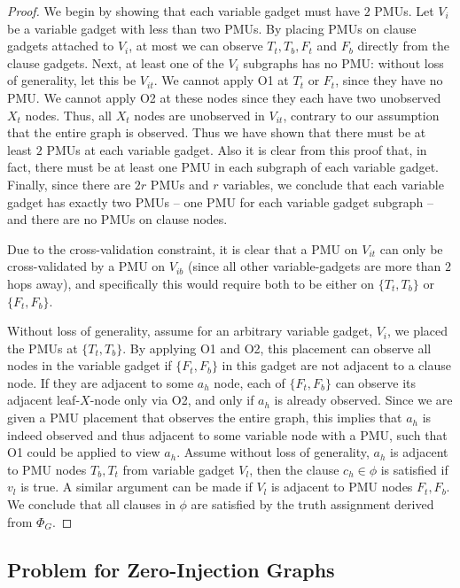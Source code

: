 \begin{proof}
We begin by showing that each variable gadget must have $2$ PMUs. Let
$V_i$ be a variable gadget with less than two PMUs. By placing PMUs on
clause gadgets attached to $V_i$, at most we can observe $T_t, T_b, F_t$ and
$F_b$ directly from the clause gadgets. Next, at least one of the $V_i$
subgraphs has no PMU: without loss of generality, let this be $V_{it}$. 
We cannot apply O1 at $T_t$ or $F_t$,
since they have no PMU. We cannot apply O2 at these nodes since they each have
two unobserved $X_t$ nodes. Thus, all $X_t$ nodes are unobserved in $V_{it}$,
contrary to our assumption that the entire graph is observed. Thus we have
shown that there must be at least $2$ PMUs at each variable gadget. Also 
it is clear from this proof that, in fact, there must be at least one PMU in each subgraph of each
variable gadget. Finally, since there are $2r$ PMUs and $r$ variables, we conclude that 
each variable gadget has exactly two PMUs -- one PMU for each variable gadget subgraph --
and there are no PMUs on clause nodes.

Due to the cross-validation constraint, it is clear that a PMU on $V_{it}$ can only
be cross-validated by a PMU on $V_{ib}$ (since all other variable-gadgets are
more than $2$ hops away), and specifically this would require both to be either
on $\{T_t, T_b\}$ or $\{F_t, F_b\}$. 

Without loss of generality, assume for an arbitrary variable gadget, $V_i$, 
we placed the PMUs at $\{T_t, T_b\}$. By applying O1 and O2, this
placement can observe all nodes in the variable gadget if $\{F_t, F_b\}$ in this gadget
are not adjacent to a clause node. If they are adjacent to some $a_h$ node, each of $\{F_t, F_b\}$ can observe its adjacent leaf-$X$-node only via O2, and only if
$a_h$ is already observed. Since we are given a PMU placement that observes the entire
graph, this implies that $a_h$ is indeed observed and thus adjacent to some variable node with a PMU,
such that O1 could be applied to view $a_h$. Assume without loss of generality,
$a_h$ is adjacent to PMU nodes $T_b,T_t$ from variable gadget $V_l$, then the clause $c_h \in \phi$ is
satisfied if $v_l$ is true. A similar argument can be made if $V_l$ is adjacent to
PMU nodes $F_t, F_b$. We conclude that all clauses in $\phi$ are satisfied by
the truth assignment derived from $\Phi_G$.
\end{proof}



\subsection{\xvalpart Problem for Zero-Injection Graphs}
\label{subsec:zero-xvalpart}

